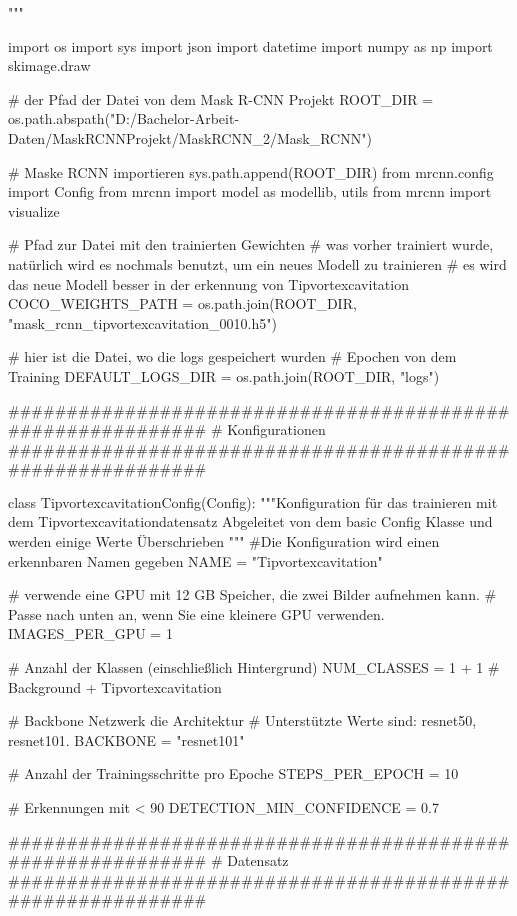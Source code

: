     
"""

import os
import sys
import json
import datetime
import numpy as np
import skimage.draw

# der Pfad der Datei von dem Mask R-CNN Projekt 
ROOT_DIR = os.path.abspath("D:/Bachelor-Arbeit-Daten/MaskRCNNProjekt/MaskRCNN_2/Mask_RCNN")

# Maske RCNN importieren
sys.path.append(ROOT_DIR)  
from mrcnn.config import Config
from mrcnn import model as modellib, utils
from mrcnn import visualize

# Pfad zur Datei mit den trainierten Gewichten
# was vorher trainiert wurde, natürlich wird es nochmals benutzt, um ein neues Modell zu trainieren 
# es wird das neue Modell besser in der erkennung von Tipvortexcavitation
COCO_WEIGHTS_PATH = os.path.join(ROOT_DIR, "mask_rcnn_tipvortexcavitation_0010.h5")

# hier ist die Datei, wo die logs gespeichert wurden 
# Epochen von dem Training 
DEFAULT_LOGS_DIR = os.path.join(ROOT_DIR, "logs")

############################################################
#  Konfigurationen
############################################################




class TipvortexcavitationConfig(Config):
    """Konfiguration für das trainieren mit dem Tipvortexcavitationdatensatz
    Abgeleitet von dem basic Config Klasse und werden einige Werte Überschrieben 
    """
    #Die Konfiguration wird einen erkennbaren Namen gegeben 
    NAME = "Tipvortexcavitation"

    # verwende eine GPU mit 12 GB Speicher, die zwei Bilder aufnehmen kann.
    # Passe nach unten an, wenn Sie eine kleinere GPU verwenden.
    IMAGES_PER_GPU = 1

    # Anzahl der Klassen (einschließlich Hintergrund)
    NUM_CLASSES = 1 + 1  # Background + Tipvortexcavitation
    
    
    # Backbone Netzwerk die Architektur
    # Unterstützte Werte sind: resnet50, resnet101.
    BACKBONE = "resnet101"

    # Anzahl der Trainingsschritte pro Epoche
    STEPS_PER_EPOCH = 10
    
    # Erkennungen mit < 90 %
    DETECTION_MIN_CONFIDENCE = 0.7
    
    
    
    
    


############################################################
#  Datensatz
############################################################

